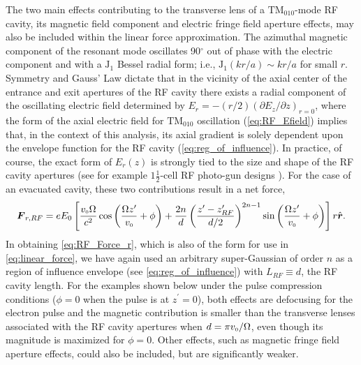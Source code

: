 The two main effects contributing to the transverse lens of a $\text{TM}_{010}$-mode RF cavity, its magnetic field component and electric fringe field aperture effects, may also be included within the linear force approximation.
The azimuthal magnetic component of the resonant mode oscillates 90$^{\circ}$ out of phase with the electric component and with a $\operatorname{ J_{1} }$ Bessel radial form; i.e., $ \operatorname{ J_{1} }( k r / a ) \sim k r / a $ for small $r$.
Symmetry and Gauss' Law dictate that in the vicinity of the axial center of the entrance and exit apertures of the RF cavity there exists a radial component of the oscillating electric field determined by $ E_{r} = -\left ( r / 2 \right ) \left ( \partial E_{z} / \partial z \right )_{r=0} $,\cite{kim_rf_1989} where the form of the axial electric field for $\text{TM}_{010}$ oscillation (\ref{eq:RF_Efield}) implies that, in the context of this analysis, its axial gradient is solely dependent upon the envelope function for the RF cavity (\ref{eq:reg_of_influence}).
In practice, of course, the exact form of $E_{r}(z)$ is strongly tied to the size and shape of the RF cavity apertures (see for example $1 \frac{1}{2}$-cell RF photo-gun designs \cite{mcdonald_design_1988}). 
For the case of an evacuated cavity, these two contributions result in a net force,
\begin{equation} \label{eq:RF_Force_r}
  \boldsymbol{F}_{ r , RF } = e E_{0} \left [ 
    \frac{ v_{{\scriptscriptstyle 0}} \Omega }{c^{2}} \cos \left ( \frac{ \Omega z^{\prime} }{ v_{{\scriptscriptstyle 0}} } + \phi \right ) + \frac{2 n}{d} \left ( \frac{z^{\prime} - z^{\prime}_{RF}}{d / 2} \right )^{2 n - 1} \sin \left ( \frac{ \Omega z^{\prime} }{ v_{{\scriptscriptstyle 0}} } + \phi \right )
   \right ] r \hat{\operatorname{ \boldsymbol{r} }} \text{.}
\end{equation}
In obtaining \ref{eq:RF_Force_r}, which is also of the form for use in \ref{eq:linear_force}, we have again used an arbitrary super-Gaussian of order $n$ as a region of influence envelope (see \ref{eq:reg_of_influence}) with $L_{RF} \equiv d$, the RF cavity length.
For the examples shown below under the pulse compression conditions ($\phi = 0$ when the pulse is at $z^{\prime} = 0$), both effects are defocusing for the electron pulse and the magnetic contribution is smaller than the transverse lenses associated with the RF cavity apertures when $ d = \pi v_{{\scriptscriptstyle 0}} / \Omega $,\cite{kim_rf_1989} even though its magnitude is maximized for $\phi = 0$.
Other effects, such as magnetic fringe field aperture effects, could also be included, but are significantly weaker.

